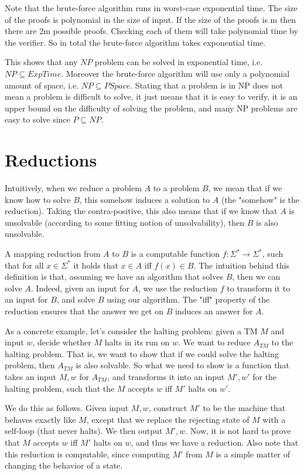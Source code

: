 Note that the brute-force algorithm runs in worst-case exponential time. The size of the proofs is polynomial in the size of input. If the size of the proofs is m then there are 2m possible proofs. Checking each of them will take polynomial time by the verifier. So in total the brute-force algorithm takes exponential time.

This shows that any $NP$ problem can be solved in exponential time, i.e. $NP \subseteq ExpTime$. Moreover the brute-force algorithm will use only a polynomial amount of space, i.e. $NP \subseteq PSpace$. Stating that a problem is in NP does not mean a problem is difficult to solve, it just means that it is easy to verify, it is an upper bound on the difficulty of solving the problem, and many NP problems are easy to solve since $P \subseteq NP$.

\section{Reductions}
Intuitively, when we reduce a problem $A$ to a problem $B$, we mean that if we know how to solve $B$, this somehow induces a solution to $A$ (the "somehow" is the reduction). Taking the contra-positive, this also means that if we know that $A$ is unsolvable (according to some fitting notion of unsolvability), then $B$ is also unsolvable.

A mapping reduction from $A$ to $B$ is a computable function $f:\Sigma^*\to \Sigma^*$, such that for all $x\in \Sigma^*$ it holds that $x\in A$ iff $f(x)\in B$. The intuition behind this definition is that, assuming we have an algorithm that solves $B$, then we can solve $A$. Indeed, given an input for $A$, we use the reduction $f$ to transform it to an input for $B$, and solve $B$ using our algorithm. The "iff" property of the reduction ensures that the answer we get on $B$ induces an answer for $A$.

As a concrete example, let's consider the halting problem: given a TM $M$ and input $w$, decide whether $M$ halts in its run on $w$.
We want to reduce $A_{TM}$ to the halting problem. That is, we want to show that if we could solve the halting problem, then $A_{TM}$ is also solvable. So what we need to show is a function that takes an input $M,w$ for $A_{TM}$, and transforms it into an input $M',w'$ for the halting problem, such that the $M$ accepts $w$ iff $M'$ halts on $w'$.

We do this as follows. Given input $M,w$, construct $M'$ to be the machine that behaves exactly like $M$, except that we replace the rejecting state of $M$ with a self-loop (that never halts). We then output $M',w$. Now, it is not hard to prove that $M$ accepts $w$ iff $M'$ halts on $w$, and thus we have a reduction. Also note that this reduction is computable, since computing $M'$ from $M$ is a simple matter of changing the behavior of a state.

